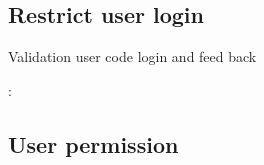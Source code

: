 \documentclass[letterpaper,10pt,english,openany,oneside]{sphinxmanual}
\begin{document}
\subsection{Restrict user login}
\label{\detokenize{api/v4:restrict-user-login}}

\begin{fulllineitems}
\label{\detokenize{api/v4:post--api4-Users-restrict_login}}
\sphinxAtStartPar
Validation user code login and feed back

\sphinxAtStartPar
{}:

\begin{sphinxVerbatim}[commandchars=\\\{\}]
   
   
   
   
\end{sphinxVerbatim}

\end{fulllineitems}



\subsection{User permission}
\label{\detokenize{api/v4:user-permission}}
\end{document}
